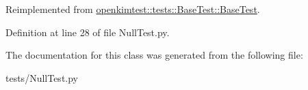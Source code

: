 Reimplemented from \hyperlink{classopenkimtest_1_1tests_1_1BaseTest_1_1BaseTest_a585c4839595e8fb6775e1e602b3aed5c}{openkimtest::tests::BaseTest::BaseTest}.



Definition at line 28 of file NullTest.py.



The documentation for this class was generated from the following file:\begin{DoxyCompactItemize}
\item 
tests/NullTest.py\end{DoxyCompactItemize}
